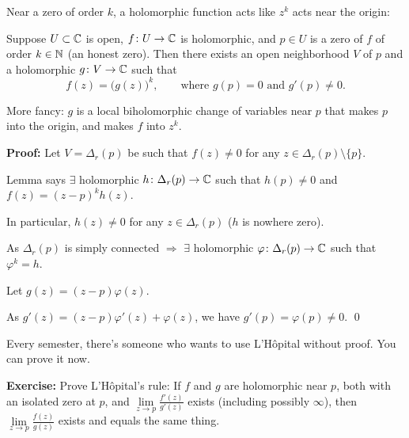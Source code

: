 \documentclass[10pt,aspectratio=169]{beamer}
\begin{document}
\begin{frame}

Near a zero of order $k$, a holomorphic function acts like
$z^k$ acts near the origin:

\pause

\begin{theorem}
Suppose $U \subset {\mathbb{C}}$ is open, $f \colon U \to {\mathbb{C}}$ is holomorphic,
and $p \in U$ is a zero of $f$ of order $k \in {\mathbb{N}}$ (an honest zero).
\pause
Then there exists an open neighborhood $V$
of $p$ and a holomorphic $g \colon V \to {\mathbb{C}}$ such that
\[
f(z) = {\bigl( g(z) \bigr)}^k,
\qquad
\text{where $g(p) = 0$ and $g'(p) \not= 0$.}
\]
\end{theorem}

\medskip
\pause

More fancy: $g$ is a local biholomorphic change of variables near
$p$
that makes $p$ into the origin, and makes $f$ into $z^k$.

\medskip
\pause

\textbf{Proof:}
Let $V = \Delta_r(p)$ be such that $f(z) \not= 0$ for any $z \in
\Delta_r(p) \setminus \{ p \}$.

\medskip
\pause

Lemma says $\exists$ holomorphic
$h \colon \Delta_r(p) \to {\mathbb{C}}$ such that
$h(p) \not= 0$ and $f(z) = {(z-p)}^k h(z)$.

\medskip
\pause

In particular,
$h(z) \not= 0$ for any $z \in \Delta_r(p)$ ($h$ is nowhere zero).

\medskip
\pause

As
$\Delta_r(p)$ is simply connected
$\Rightarrow$
$\exists$ holomorphic $\varphi \colon \Delta_r(p) \to {\mathbb{C}}$ such that
$\varphi^k = h$.

\medskip
\pause

Let $g(z) = (z-p)\varphi(z)$.

\medskip
\pause

As
$g'(z) = (z-p) \varphi'(z) + \varphi(z)$, we have $g'(p) = \varphi(p) \not= 0$.
\qed
\end{frame}

\begin{frame}

Every semester, there's someone who wants to use L'H\^{o}pital without
proof.  You can prove it now.

\medskip
\pause

\textbf{Exercise:}
Prove L'H\^{o}pital's rule: If $f$ and $g$ are holomorphic near $p$,
both with an isolated zero at $p$, and
$\lim\limits_{z\to p} \frac{f'(z)}{g'(z)}$ exists (including possibly $\infty$), then
$\lim\limits_{z\to p} \frac{f(z)}{g(z)}$ exists and equals the same thing.
\end{frame}
\end{document}

